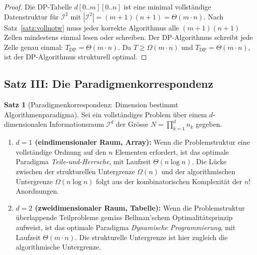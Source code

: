 ﻿\documentclass[a4paper,12pt]{article}
\theoremstyle{definition}
\newtheorem{satz}{Satz}
\begin{document}
\begin{proof}
    Die DP-Tabelle $d[0..m][0..n]$ ist eine minimal vollst\"{a}ndige
    Datenstruktur f\"{u}r $\mathcal{I}^2$ mit
    $|\mathcal{I}^2| = (m+1)(n+1) = \Theta(m \cdot n)$.
    Nach Satz~\ref{satz:vollnotw} muss jeder korrekte Algorithmus alle
    $(m+1)(n+1)$ Zellen mindestens einmal lesen oder schreiben.
    Der DP-Algorithmus schreibt jede Zelle genau einmal:
    $T_{\mathrm{DP}} = \Theta(m \cdot n)$. Da $T \geq \Omega(m \cdot n)$
    und $T_{\mathrm{DP}} = \Theta(m \cdot n)$, ist der DP-Algorithmus
    strukturell optimal. \qedhere
\end{proof}

\subsection{Satz III: Die Paradigmenkorrespondenz}

\begin{satz}[Paradigmenkorrespondenz: Dimension bestimmt Algorithmenparadigma]
    \label{satz:paradigmkorr}
    Sei ein vollst\"{a}ndiges Problem \"{u}ber einem $d$-dimensionalen
    Informationsraum $\mathcal{I}^d$ der Gr\"{o}sse $N = \prod_{k=1}^d n_k$ gegeben.
    \begin{enumerate}
        \item \textbf{$d = 1$ (eindimensionaler Raum, Array):}
              Wenn die Problemstruktur eine vollst\"{a}ndige Ordnung auf den
              $n$ Elementen erfordert, ist das optimale Paradigma
              \emph{Teile-und-Herrsche}, mit Laufzeit $\Theta(n \log n)$.
              Die L\"{u}cke zwischen der strukturellen Untergrenze $\Omega(n)$
              und der algorithmischen Untergrenze $\Omega(n \log n)$ folgt
              aus der kombinatorischen Komplexit\"{a}t der $n!$ Anordnungen.
        \item \textbf{$d = 2$ (zweidimensionaler Raum, Tabelle):}
              Wenn die Problemstruktur \"{u}berlappende Teilprobleme gem\"{a}ss
              Bellman'schem Optimalit\"{a}tsprinzip aufweist, ist das optimale
              Paradigma \emph{Dynamische Programmierung}, mit Laufzeit
              $\Theta(m \cdot n)$. Die strukturelle Untergrenze ist hier
              zugleich die algorithmische Untergrenze.
    \end{enumerate}
\end{satz}
\end{document}
